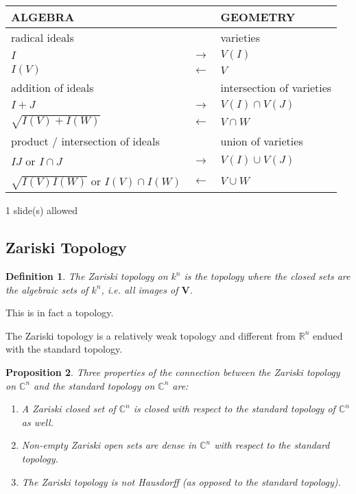 \documentclass[11pt,a4paper,english]{scrartcl}
\newtheorem{defn}{Definition}
\newtheorem{prop}[defn]{Proposition}
\newcommand{\C}{\mathbb{C}}
\newcommand{\V}{\mathbf{V}}
\newcommand{\needSlides}[1]{\newpage \begin{needSl}#1 slide(s) allowed\end{needSl}}
\begin{document}
\begin{center}
\begin{tabular}{>{\Centering}p{} >{\Centering}p{} >{\Centering}p{} }
\toprule
\textbf{ALGEBRA} & & \textbf{GEOMETRY}\\
\midrule
radical ideals & & varieties\\
$I$ & $\rightarrow$ & $V(I)$\\
$I(V)$ & $\leftarrow$ & $V$\\
\midrule
addition of ideals & &intersection of varieties\\ 
$I+J$ & $\rightarrow$ & $V(I) \cap V(J)$\\
$\sqrt{I(V)+I(W)}$ & $\leftarrow$ & $V\cap W$\\
\midrule
product / intersection of ideals & & union of varieties\\
$IJ$ or $I\cap J$ & $\rightarrow$ & $V(I)\cup V(J)$\\
$\sqrt{I(V)I(W)}$ or $I(V) \cap I(W)$ & $\leftarrow$ & $V\cup W$ \\
\bottomrule
\end{tabular}
\end{center}

\needSlides{1}
\subsection{Zariski Topology}
\begin{defn}
The \emph{Zariski topology} on $k^n$ is the topology where the closed sets are the algebraic sets of $k^n$, i.e. all images of $\V$.
\end{defn}
This is in fact a topology.

The Zariski topology is a relatively weak topology and different from $\mathbb{R}^n$ endued with the standard topology.


\begin{prop} \label{propZarprops} Three properties of the connection between the Zariski topology on $\C^n $ and the standard topology on $\C^n$ are:
\begin{enumerate}
\item A Zariski closed set of $\mathbb{C}^n$ is closed with respect to the standard topology of $\mathbb{C}^n$ as well.
\item Non-empty Zariski open sets are dense in $\mathbb{C}^n$ with respect to the standard topology.
\item The Zariski topology is not Hausdorff (as opposed to the standard topology).
\end{enumerate}
\end{prop}
\end{document}
